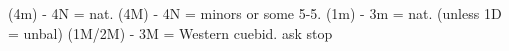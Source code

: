 (4m) - 4N = nat. 
(4M) - 4N = minors or some 5-5.
(1m) - 3m = nat. (unless 1D = unbal)
(1M/2M) - 3M = Western cuebid. ask stop